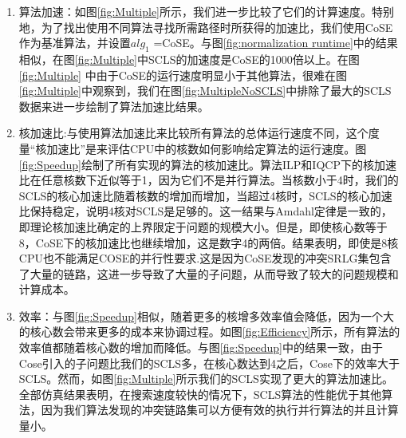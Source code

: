 \begin{enumerate}
   \item   算法加速：如图\ref{fig:Multiple}所示，我们进一步比较了它们的计算速度。特别地，为了找出使用不同算法寻找所需路径时所获得的加速比，我们使用CoSE作为基准算法，并设置$alg_1$ =CoSE。与图\ref{fig:normalization runtime}中的结果相似，在图\ref{fig:Multiple}中SCLS的加速度是CoSE的1000倍以上。在图\ref{fig:Multiple} 中由于CoSE的运行速度明显小于其他算法，很难在图\ref{fig:Multiple}中观察到，我们在图\ref{fig:MultipleNoSCLS}中排除了最大的SCLS数据来进一步绘制了算法加速比结果。
   \item 核加速比:与使用算法加速比来比较所有算法的总体运行速度不同，这个度量“核加速比”是来评估CPU中的核数如何影响给定算法的运行速度。图\ref{fig:Speedup}绘制了所有实现的算法的核加速比。算法ILP和IQCP下的核加速比在任意核数下近似等于1，因为它们不是并行算法。当核数小于4时，我们的SCLS的核心加速比随着核数的增加而增加，当超过4核时，SCLS的核心加速比保持稳定，说明4核对SCLS是足够的。这一结果与Amdahl定律\cite{amdahl1967validity}是一致的，即理论核加速比确定的上界限定于问题的规模大小。但是，即使核心数等于8，CoSE下的核加速比也继续增加，这是数字4的两倍。结果表明，即使是8核CPU也不能满足COSE的并行性要求.这是因为CoSE发现的冲突SRLG集包含了大量的链路，这进一步导致了大量的子问题，从而导致了较大的问题规模和计算成本。
    \item 效率：与图\ref{fig:Speedup}相似，随着更多的核增多效率值会降低，因为一个大的核心数会带来更多的成本来协调过程。如图\ref{fig:Efficiency}所示，所有算法的效率值都随着核心数的增加而降低。与图\ref{fig:Speedup}中的结果一致，由于Cose引入的子问题比我们的SCLS多，在核心数达到4之后，Cose下的效率大于SCLS。然而，如图\ref{fig:Multiple}所示我们的SCLS实现了更大的算法加速比。全部仿真结果表明，在搜索速度较快的情况下，SCLS算法的性能优于其他算法，因为我们算法发现的冲突链路集可以方便有效的执行并行算法的并且计算量小。
\end{enumerate}


